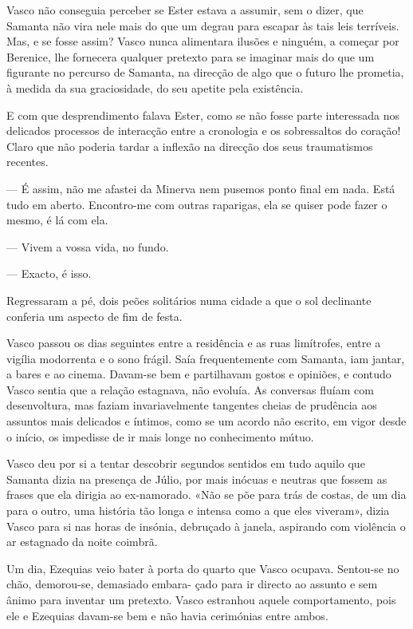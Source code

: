 Vasco não conseguia perceber se Ester estava a assumir, sem o dizer, que
Samanta não vira nele mais do que um degrau para escapar às tais leis
terríveis. Mas, e se fosse assim? Vasco nunca alimentara ilusões e
ninguém, a começar por Berenice, lhe fornecera qualquer pretexto para se
imaginar mais do que um figurante no percurso de Samanta, na direcção de
algo
que o futuro lhe prometia, à medida da sua graciosidade, do seu apetite
pela existência.

E com que desprendimento falava Ester, como se não fosse parte
interessada nos delicados processos de interacção entre a cronologia e
os sobressaltos do coração! Claro que não poderia tardar a inflexão na
direcção dos seus traumatismos recentes.

--- É assim, não me afastei da Minerva nem pusemos ponto final em nada.
  Está tudo em aberto. Encontro-me com outras raparigas, ela se quiser
  pode fazer o mesmo, é lá com ela.

--- Vivem a vossa vida, no fundo.

--- Exacto, é isso.


Regressaram a pé, dois peões solitários numa cidade a que o sol
declinante conferia um aspecto de fim de festa.

Vasco passou os dias seguintes entre a residência e as ruas limítrofes,
entre a vigília modorrenta e o sono frágil. Saía frequentemente com
Samanta, iam jantar, a bares e ao cinema. Davam-se bem e partilhavam
gostos e opiniões, e contudo Vasco sentia que a relação estagnava, não
evoluía. As conversas fluíam com desenvoltura, mas faziam
invariavelmente tangentes cheias de prudência aos assuntos mais
delicados e íntimos, como se um acordo não escrito, em vigor desde o
início, os impedisse de ir mais longe no conhecimento mútuo.

Vasco deu por si a tentar descobrir segundos sentidos em tudo aquilo que
Samanta dizia na presença de Júlio, por mais inócuas e neutras que
fossem as frases que ela dirigia ao ex-namorado. «Não se põe para trás
de costas, de um dia para o outro, uma história tão longa e intensa como
a que eles viveram», dizia Vasco para si nas horas de insónia, debruçado
à janela, aspirando com violência o ar estagnado da noite coimbrã.

Um dia, Ezequias veio bater à porta do quarto que Vasco
ocupava. Sentou-se no chão, demorou-se, demasiado embara- çado para ir
directo ao assunto e sem ânimo para inventar um pretexto. Vasco
estranhou aquele comportamento, pois ele e Ezequias davam-se bem e não
havia cerimónias entre ambos.

